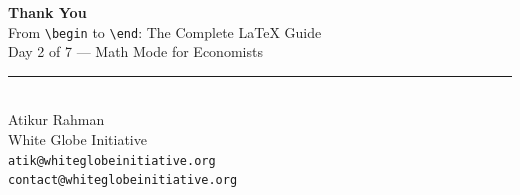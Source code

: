 \documentclass[11pt,aspectratio=169]{beamer}
\begin{document}
\begin{frame}[plain]
  \begin{center}
    \vspace{35pt}
    {\Large\bfseries Thank You}\\[10pt]
    {\large From \texttt{\textbackslash begin} to \texttt{\textbackslash end}: The Complete LaTeX Guide}\\[4pt]
    Day 2 of 7 --- Math Mode for Economists\\[20pt]
    \rule{0.5\textwidth}{0.4pt}\\[10pt]
    Atikur Rahman \\
    White Globe Initiative \\[2pt]
    \texttt{atik@whiteglobeinitiative.org} \\
    \texttt{contact@whiteglobeinitiative.org}
  \end{center}
\end{frame}
\end{document}
